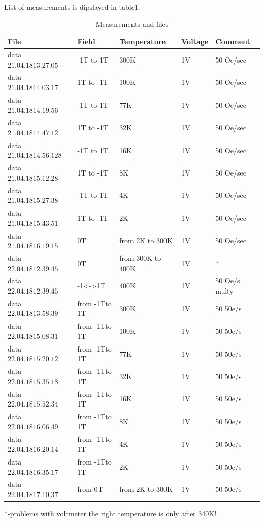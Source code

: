 \documentclass[idxtotoc,hyperref,openany,oneside]{labbook} %
\begin{document}
List of measurements is dipslayed in  table1.
 \begin{table}[H]
\begin{tabular}{l l l l l}
\toprule
\textbf{File} & \textbf{Field} & \textbf{Temperature}& \textbf{Voltage}& \textbf{Comment}\\
\toprule
data$21.04.18 13.27.05$& -1T to 1T   & 300K & 1V& 50 Oe/sec\\
data$21.04.18 14.03.17$& 1T to -1T   & 100K & 1V& 50 Oe/sec\\
data$21.04.18 14.19.56$& -1T to 1T   & 77K & 1V& 50 Oe/sec\\
data$21.04.18 14.47.12$& 1T to -1T   & 32K & 1V& 50 Oe/sec\\
data$21.04.18 14.56.128$& -1T to 1T   & 16K & 1V& 50 Oe/sec\\
data$21.04.18 15.12.28$& 1T to -1T   & 8K & 1V& 50 Oe/sec\\
data$21.04.18 15.27.38$& -1T to 1T   & 4K & 1V& 50 Oe/sec\\
data$21.04.18 15.43.51$& 1T to -1T   & 2K & 1V& 50 Oe/sec\\
data$21.04.18 16.19.15$& 0T   & from 2K to 300K & 1V& 50 Oe/sec\\
data$22.04.18 12.39.45$& 0T   & from 300K to 400K & 1V& *\\
data$22.04.18 12.39.45$& -1<->1T  &  400K & 1V& 50 Oe/s multy\\
data$22.04.18 13.58.39$& from -1Tto 1T  &  300K & 1V& 50 50e/s \\
data$22.04.18 15.08.31$& from -1Tto 1T  &  100K & 1V& 50 50e/s \\
data$22.04.18 15.20.12$& from -1Tto 1T  &  77K & 1V& 50 50e/s \\
data$22.04.18 15.35.18$& from -1Tto 1T  &  32K & 1V& 50 50e/s \\
data$22.04.18 15.52.34$& from -1Tto 1T  &  16K & 1V& 50 50e/s \\
data$22.04.18 16.06.49$& from -1Tto 1T  &  8K & 1V& 50 50e/s \\
data$22.04.18 16.20.14$& from -1Tto 1T  &  4K & 1V& 50 50e/s \\
data$22.04.18 16.35.17$& from -1Tto 1T  &  2K & 1V& 50 50e/s \\
data$22.04.18 17.10.37$& from 0T  &  from 2K to 300K & 1V& 50 50e/s \\







\bottomrule
\end{tabular}
\caption{Measurements and files}
\label{tab:Measurements and files}
\end{table}
*-problems with voltmeter the right temperature is only after 340K! 
\newline
\end{document}
